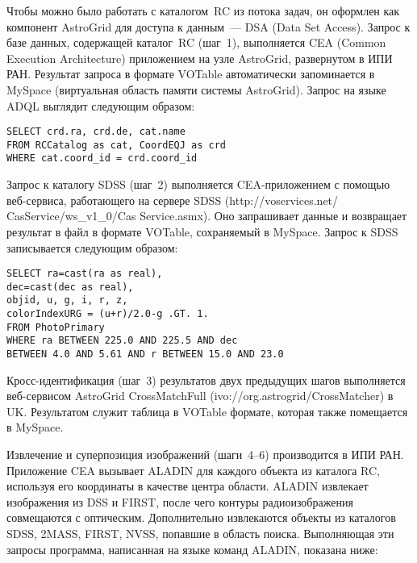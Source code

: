 \begin{multicols}{2}
Чтобы можно было работать с каталогом~RC из потока задач, он оформлен как компонент 
AstroGrid для доступа к данным~--- DSA ({Data Set Access}). Запрос к базе данных, 
содержащей каталог~RC (шаг~1), выполняется CEA ({Common Execution 
Architecture}) приложением на узле AstroGrid, развернутом в ИПИ РАН. Результат запроса 
в формате VOTable автоматически запоминается в MySpace (виртуальная область памяти 
сис\-те\-мы AstroGrid). Запрос на языке ADQL выглядит следующим образом: 



\noindent
{\small
\begin{verbatim}
SELECT crd.ra, crd.de, cat.name 
FROM RCCatalog as cat, CoordEQJ as crd
WHERE cat.coord_id = crd.coord_id
\end{verbatim}
}


      
Запрос к каталогу SDSS (шаг~2) выполняется CEA-приложением с помощью веб-сер\-ви\-са, 
работающего на сервере SDSS 
({\sf http://voservices.net/ CasService/ws\_v1\_0/Cas} Service.asmx). Оно запрашивает данные и 
возвращает результат в файл в формате VOTable, сохраняемый в MySpace. Запрос к 
SDSS записывается следующим образом: 



\noindent
{\small
\begin{verbatim}
SELECT ra=cast(ra as real),
dec=cast(dec as real), 
objid, u, g, i, r, z, 
colorIndexURG = (u+r)/2.0-g .GT. 1. 
FROM PhotoPrimary 
WHERE ra BETWEEN 225.0 AND 225.5 AND dec 
BETWEEN 4.0 AND 5.61 AND r BETWEEN 15.0 AND 23.0 
\end{verbatim}
}



Кросс-идентификация (шаг~3) результатов двух предыдущих шагов выполняется 
веб-сер\-ви\-сом\linebreak
AstroGrid CrossMatchFull ({\sf ivo://org.astrogrid/\linebreak CrossMatcher}) в UK. 
Результатом служит таблица в VOTable формате, которая также помещается в MySpace. 

Извлечение и суперпозиция изображений (шаги~4--6) производится в ИПИ РАН. 
При\-ло\-же\-ние CEA вызывает ALADIN для каждого объекта из каталога RC, 
используя его координаты в качестве центра области. ALADIN извлекает изображения из 
DSS и FIRST, после чего контуры радиоизображения совмещаются с оптическим. 
Дополнительно извлекаются объекты из каталогов SDSS, 2MASS, FIRST, NVSS, 
попавшие в область поиска. Выполняющая эти запросы программа, написанная на языке 
команд ALADIN, показана ниже: 


\end{multicols}

